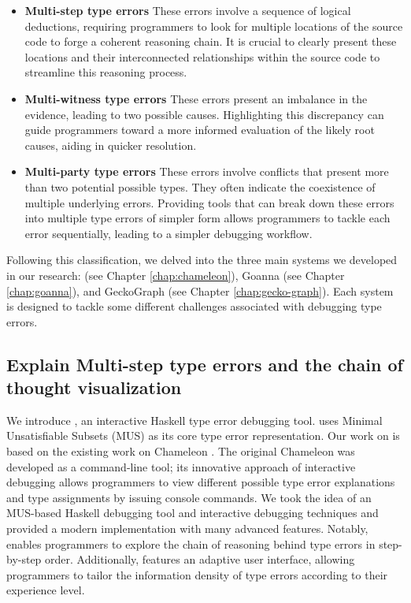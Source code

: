 \begin{itemize}
    \item {\textbf{Multi-step type errors} These errors involve a sequence of logical deductions, requiring programmers to look for multiple locations of the source code to forge a coherent reasoning chain. It is crucial to clearly present these locations and their interconnected relationships within the source code to streamline this reasoning process.}
    \item{\textbf{Multi-witness type errors}  These errors present an imbalance in the evidence, leading to two possible causes. Highlighting this discrepancy can guide programmers toward a more informed evaluation of the likely root causes, aiding in quicker resolution.}
    \item{\textbf{Multi-party type errors} These errors involve conflicts that present more than two potential possible types. They often indicate the coexistence of multiple underlying errors. Providing tools that can break down these errors into multiple type errors of simpler form allows programmers to tackle each error sequentially, leading to a simpler debugging workflow.}
\end{itemize}


Following this classification, we delved into the three main systems we developed in our research:\chameleon{} (see Chapter \ref{chap:chameleon}), Goanna (see Chapter \ref{chap:goanna}), and GeckoGraph (see Chapter \ref{chap:gecko-graph}). Each system is designed to tackle some different challenges associated with debugging type errors.

\subsection*{Explain Multi-step type errors and the chain of thought visualization}


We introduce \textbf{\chameleon{}}, an interactive Haskell type error debugging tool. \chameleon{} uses Minimal Unsatisfiable Subsets (MUS) as its core type error representation. Our work on \chameleon{} is based on the existing work on Chameleon \cite{Stuckey2003-pz, Wazny2006-ll}. The original Chameleon was developed as a command-line tool; its innovative approach of interactive debugging allows programmers to view different possible type error explanations and type assignments by issuing console commands.  We took the idea of an MUS-based Haskell debugging tool and interactive debugging techniques and provided a modern implementation with many advanced features. Notably, \chameleon{} enables programmers to explore the chain of reasoning behind type errors in step-by-step order. Additionally, \chameleon{} features an adaptive user interface, allowing programmers to tailor the information density of type errors according to their experience level.



